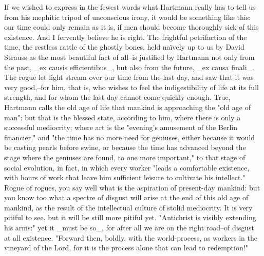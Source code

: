 If we wished to express in the fewest words what Hartmann really has
to tell us from his mephitic tripod of unconscious irony, it would be
something like this: our time could only remain as it is, if men
should become thoroughly sick of this existence. And I fervently
believe he is right. The frightful petrifaction of the time, the
restless rattle of the ghostly bones, held naïvely up to us by David
Strauss as the most beautiful fact of all--is justified by Hartmann
not only from the past, _ex causis efficientibus_, but also from the
future, _ex causa finali_. The rogue let light stream over our time
from the last day, and saw that it was very good,--for him, that is,
who wishes to feel the indigestibility of life at its full strength,
and for whom the last day cannot come quickly enough. True, Hartmann
calls the old age of life that mankind is approaching the "old age of
man": but that is the blessed state, according to him, where there is
only a successful mediocrity; where art is the "evening's amusement
of the Berlin financier," and "the time has no more need for
geniuses, either because it would be casting pearls before swine, or
because the time has advanced beyond the stage where the geniuses are
found, to one more important," to that stage of social evolution, in
fact, in which every worker "leads a comfortable existence, with
hours of work that leave him sufficient leisure to cultivate his
intellect." Rogue of rogues, you say well what is the aspiration of
present-day mankind: but you know too what a spectre of disgust will
arise at the end of this old age of mankind, as the result of the
intellectual culture of stolid mediocrity. It is very pitiful to see,
but it will be still more pitiful yet. "Antichrist is visibly
extending his arms:" yet it _must be so_, for after all we are on the
right road--of disgust at all existence. "Forward then, boldly, with
the world-process, as workers in the vineyard of the Lord, for it is
the process alone that can lead to redemption!"

